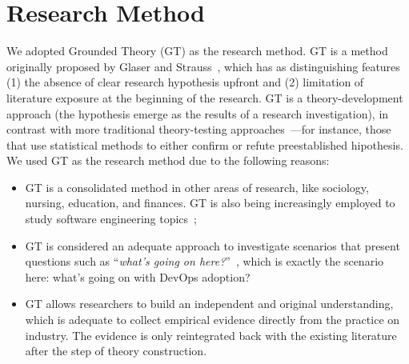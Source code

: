 \section{Research Method} \label{sec:research_method}

We adopted Grounded Theory (GT) as the research method. GT is a method
originally proposed by Glaser and Strauss~\cite{glase1967discovery}, which has
as distinguishing features (1) the absence of clear research hypothesis upfront
and (2) limitation of literature exposure at the beginning of the research. GT
is a theory-development approach (the hypothesis emerge as the results of
a research investigation), in contrast with more traditional
theory-testing approaches~\cite{coleman2007using}---for instance,  those that
use statistical methods to either confirm or refute preestablished hipothesis. 
We used GT as the research method due to the following reasons:



\begin{itemize}

\item GT is a consolidated method in other areas of research, like sociology,
nursing, education, and finances. GT is also being increasingly employed
to study software engineering topics~\cite{Hoda:2017:ICSE,stol2016grounded,Waterman:2015:ICSE};

\item GT is considered an adequate approach to investigate scenarios that present 
questions such as ``\textit{what's going on here?}''~\cite{barnsteiner2002using},
which is exactly the scenario here: what's going on with DevOps adoption?

\item GT allows researchers to build an independent and original understanding, 
which is adequate to collect empirical evidence directly from the
practice on industry. The evidence
is only reintegrated back with the existing literature after the step of
theory construction.

\end{itemize}

